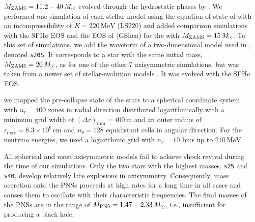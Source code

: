  
 $M_{\mathrm{ZAMS}} = 11.2 - 40 \, M_{\odot}$
 evolved through the hydrostatic phases by
\cite{Woosley_Heger_Weaver__2002__ReviewsofModernPhysics__The_evolution_and_explosion_of_massive_stars}.
We performed one simulation of each stellar model using the equation
of state of \cite{Lattimer_Swesty__1991__NuclearPhysicsA__LS-EOS} with
an incompressibility of $K = 220 \, \mathrm{MeV}$ (LS220) and added
comparison simulations with the SFHo EOS
\cite{Steiner_et_al__2013__apj__Core-collapseSupernovaEquationsofStateBasedonNeutronStarObservations}
and the EOS of
\cite{Shen_et_al__2011__prc__Newequationofstateforastrophysicalsimulations}
(GShen) for the  with $M_{\mathrm{ZAMS}} = 15 \, M_{\odot}$.  To this set of
simulations, we add the waveform of a two-dimensional model used in
\cite{Torres:2019a}, denoted \texttt{s20S}.  It corresponds to a star
with the same initial mass, $M_{\mathrm{ZAMS}} = 20 \, M_{\odot}$, as for
one of the other 7 axisymmetric simulations, but was taken from a
newer set of stellar-evolution models
\cite{Woosley_Heger__2007__physrep__Nucleosynthesisandremnantsinmassivestarsofsolarmetallicity}.
It was evolved with the SFHo EOS.

 we mapped the pre-collapse state of the stars to a spherical
coordinate system with $n_r = 400$ zones in radial direction
distributed logarithmically with a minimum grid width of
$(\Delta r)_{\mathrm{min}} = 400 \, \mathrm{m}$ and an outer radius of
$r_{\mathrm{max}} = 8.3 \times 10^{9} \, \mathrm{cm}$ and
$n_{\theta} = 128$ equidistant cells in angular direction.  For the
neutrino energies, we used a logarithmic grid with $n_e = 10$ bins up
to $240 \, \mathrm{MeV}$.

All spherical and most axisymmetric models fail to achieve shock
revival during the time of our simulations.  Only the two stars with
the highest masses, \texttt{s25} and \texttt{s40}, develop relatively
late explosions in axisymmetry.  Consequently, mass accretion onto the
PNSs proceeds at high rates for a long time in all cases and causes
them to oscillate with their characteristic frequencies.  The final
masses of the PNSs are in the range of
$M_{\mathrm{PNS}} = 1.47 - 2.33 \, M_{\odot}$, i.e., insufficient for
producing a black hole.


 	

